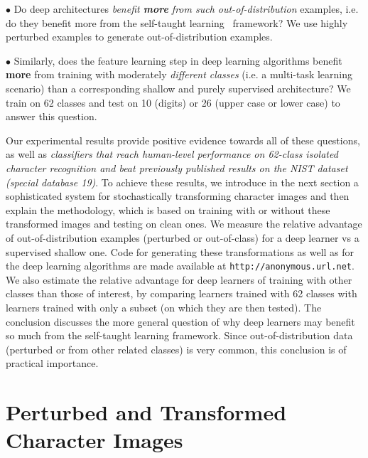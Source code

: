 \documentclass{article} %
\begin{document}
$\bullet$ %
Do deep architectures {\em benefit {\bf more} from such out-of-distribution}
examples, i.e. do they benefit more from the self-taught learning~\citep{RainaR2007} framework?
We use highly perturbed examples to generate out-of-distribution examples.

$\bullet$ %
Similarly, does the feature learning step in deep learning algorithms benefit {\bf more}
from training with moderately {\em different classes} (i.e. a multi-task learning scenario) than
a corresponding shallow and purely supervised architecture?
We train on 62 classes and test on 10 (digits) or 26 (upper case or lower case)
to answer this question.

Our experimental results provide positive evidence towards all of these questions,
as well as {\em classifiers that reach human-level performance on 62-class isolated character
recognition and beat previously published results on the NIST dataset (special database 19)}.
To achieve these results, we introduce in the next section a sophisticated system
for stochastically transforming character images and then explain the methodology,
which is based on training with or without these transformed images and testing on 
clean ones. We measure the relative advantage of out-of-distribution examples
(perturbed or out-of-class)
for a deep learner vs a supervised shallow one.
Code for generating these transformations as well as for the deep learning 
algorithms are made available at {\tt http://anonymous.url.net}.%
We also estimate the relative advantage for deep learners of training with
other classes than those of interest, by comparing learners trained with
62 classes with learners trained with only a subset (on which they
are then tested).
The conclusion discusses
the more general question of why deep learners may benefit so much from 
the self-taught learning framework. Since out-of-distribution data
(perturbed or from other related classes) is very common, this conclusion
is of practical importance.

\vspace*{-3mm}
\section{Perturbed and Transformed Character Images}
\label{s:perturbations}
\vspace*{-2mm}
\end{document}
